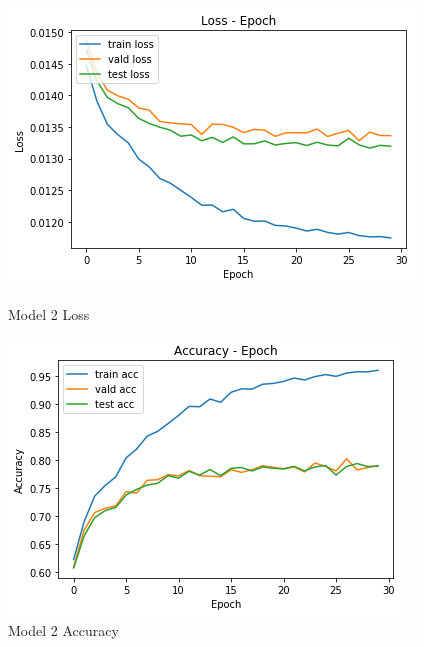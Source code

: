 \documentclass{article}
\begin{document}
\begin{figure}[h]
\begin{minipage}{0.48\textwidth}
\centering
\includegraphics[width=\textwidth]{pics/2_loss.png}
\caption{Model 2 Loss}
\end{minipage}
\hfill
\begin{minipage}{0.48\textwidth}
\centering
\includegraphics[width=\textwidth]{pics/2_acc.png}
\caption{Model 2 Accuracy}
\end{minipage}


\end{figure}
\end{document}
